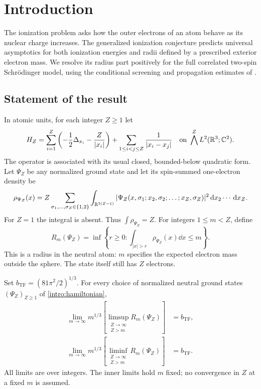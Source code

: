\section{Introduction}\label{sec:introduction}

The ionization problem asks how the outer electrons of an atom behave
as its nuclear charge increases.  The generalized ionization conjecture
predicts universal asymptotics for both ionization energies and radii
defined by a prescribed exterior electron mass.  We resolve its radius
part positively for the full correlated two-spin Schr\"odinger model,
using the conditional screening and propagation estimates of
\cite{OuterRadius}.

\subsection{Statement of the result}

In atomic units, for each integer $Z\ge1$ let
\begin{equation}\label{intro:hamiltonian}
 H_Z=\sum_{i=1}^{Z}\left(-\frac12\Delta_{x_i}-\frac{Z}{|x_i|}\right)
       +\sum_{1\le i<j\le Z}\frac1{|x_i-x_j|}
 \quad\hbox{on }\bigwedge^ZL^2(\mathbb R^3;\mathbb C^2).
\end{equation}
The operator is associated with its usual closed, bounded-below quadratic
form.  Let $\Psi_Z$ be any normalized ground state and let its spin-summed
one-electron density be
\begin{equation}\label{intro:density}
 \rho_{\Psi_Z}(x)
 =Z\sum_{\sigma_1,\ldots,\sigma_Z\in\{1,2\}}
   \int_{\mathbb R^{3(Z-1)}}
   |\Psi_Z(x,\sigma_1;x_2,\sigma_2;\ldots;x_Z,\sigma_Z)|^2
   \,\mathrm d x_2\cdots\,\mathrm d x_Z.
\end{equation}
For $Z=1$ the integral is absent.  Thus $\int\rho_{\Psi_Z}=Z$.
For integers $1\le m<Z$, define
\begin{equation}\label{intro:radius}
 R_m(\Psi_Z)=\inf\left\{r\ge0:
               \int_{|x|>r}\rho_{\Psi_Z}(x)\dd x\le m\right\}.
\end{equation}
This is a radius in the neutral atom: $m$ specifies the expected electron
mass outside the sphere.  The state itself still has $Z$ electrons.

\begin{theorem}\label{intro:main}
Set $b_{\mathrm{TF}}=(81\pi^2/2)^{1/3}$.  For every choice of normalized
neutral ground states $(\Psi_Z)_{Z\ge1}$ of \eqref{intro:hamiltonian},
\begin{align}
 \lim_{m\to\infty}m^{1/3}
       \left[\limsup_{\substack{Z\to\infty\\ Z>m}}R_m(\Psi_Z)\right]
       &=b_{\mathrm{TF}},\label{intro:limsup}\\
 \lim_{m\to\infty}m^{1/3}
       \left[\liminf_{\substack{Z\to\infty\\ Z>m}}R_m(\Psi_Z)\right]
       &=b_{\mathrm{TF}}.\label{intro:liminf}
\end{align}
All limits are over integers.  The inner limits hold $m$ fixed; no
convergence in $Z$ at a fixed $m$ is assumed.
\end{theorem}

